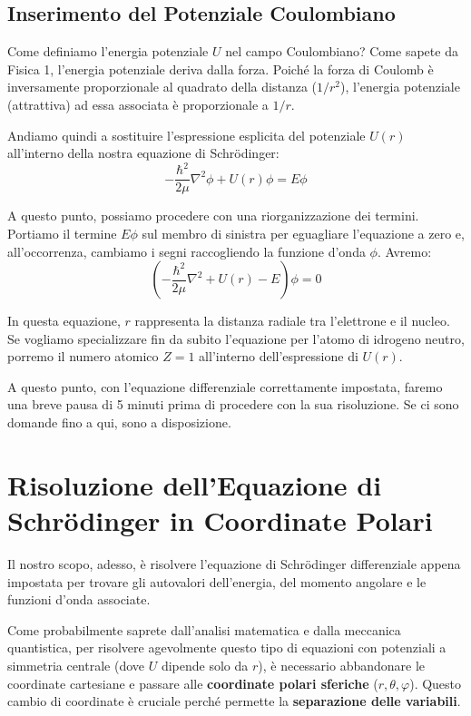 \subsection{Inserimento del Potenziale Coulombiano}

Come definiamo l'energia potenziale $U$ nel campo Coulombiano?
Come sapete da Fisica 1, l'energia potenziale deriva dalla forza. Poiché la forza di Coulomb è inversamente proporzionale al quadrato della distanza ($1/r^2$), l'energia potenziale (attrattiva) ad essa associata è proporzionale a $1/r$.

Andiamo quindi a sostituire l'espressione esplicita del potenziale $U(r)$ all'interno della nostra equazione di Schrödinger:
\begin{equation}
-\frac{\hbar^2}{2\mu} \nabla^2 \phi + U(r) \phi = E \phi
\end{equation}

A questo punto, possiamo procedere con una riorganizzazione dei termini. Portiamo il termine $E \phi$ sul membro di sinistra per eguagliare l'equazione a zero e, all'occorrenza, cambiamo i segni raccogliendo la funzione d'onda $\phi$. Avremo:
\begin{equation}
\left( -\frac{\hbar^2}{2\mu} \nabla^2 + U(r) - E \right) \phi = 0
\end{equation}

In questa equazione, $r$ rappresenta la distanza radiale tra l'elettrone e il nucleo.
Se vogliamo specializzare fin da subito l'equazione per l'atomo di idrogeno neutro, porremo il numero atomico $Z = 1$ all'interno dell'espressione di $U(r)$.

A questo punto, con l'equazione differenziale correttamente impostata, faremo una breve pausa di 5 minuti prima di procedere con la sua risoluzione. Se ci sono domande fino a qui, sono a disposizione.

\section{Risoluzione dell'Equazione di Schrödinger in Coordinate Polari}

Il nostro scopo, adesso, è risolvere l'equazione di Schrödinger differenziale appena impostata per trovare gli autovalori dell'energia, del momento angolare e le funzioni d'onda associate.

Come probabilmente saprete dall'analisi matematica e dalla meccanica quantistica, per risolvere agevolmente questo tipo di equazioni con potenziali a simmetria centrale (dove $U$ dipende solo da $r$), è necessario abbandonare le coordinate cartesiane e passare alle \textbf{coordinate polari sferiche} ($r, \theta, \varphi$).
Questo cambio di coordinate è cruciale perché permette la \textbf{separazione delle variabili}.

